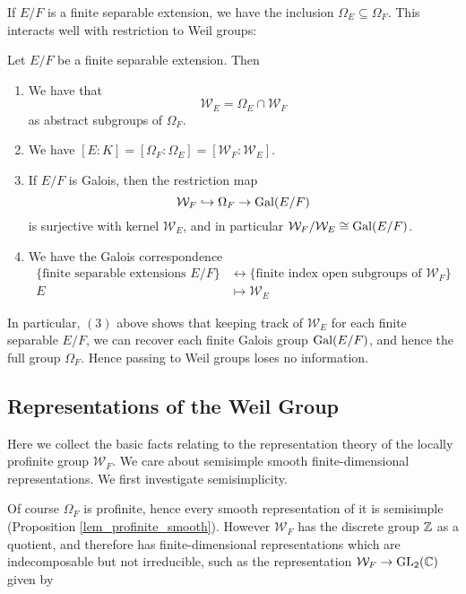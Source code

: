 If $E/F$ is a finite separable extension, we have the inclusion $\Omega_E\subseteq \Omega_F$. This interacts well with restriction to Weil groups:
\begin{prop}
	Let $E/F$ be a finite separable extension. Then
	\begin{enumerate}
		\item We have that
		\[\mathcal{W}_E = \Omega_E\cap \mathcal{W}_F\]
		as abstract subgroups of $\Omega_F$.
		\item We have $[E:K] = [\Omega_F:\Omega_E] = [\mathcal{W}_F:\mathcal{W}_E]$.
		\item If $E/F$ is Galois, then the restriction map
		\[\mathcal{W}_F \hookrightarrow \Omega_F \to \mathrm{Gal}(E/F)\]
		is surjective with kernel $\mathcal{W}_E$, and in particular $\mathcal{W}_F/\mathcal{W}_E\cong \mathrm{Gal}(E/F)$.
		\item We have the Galois correspondence
		\begin{align*}
			\{\text{finite separable extensions }E/F\} &\leftrightarrow \{\text{finite index open subgroups of }\mathcal{W}_F\}\\
			 E &\mapsto \mathcal{W}_E
		\end{align*}
	\end{enumerate}
\end{prop}
In particular, $(3)$ above shows that keeping track of $\mathcal{W}_E$ for each finite separable $E/F$, we can recover each finite Galois group $\mathrm{Gal}(E/F)$, and hence the full group $\Omega_F$. Hence passing to Weil groups loses no information.

\subsection{Representations of the Weil Group}
Here we collect the basic facts relating to the representation theory of the locally profinite group $\mathcal{W}_F$. We care about semisimple smooth finite-dimensional representations. We first investigate semisimplicity.

Of course $\Omega_F$ is profinite, hence every smooth representation of it is semisimple (Proposition \ref{lem_profinite_smooth}). However $\mathcal{W}_F$ has the discrete group $\mathbb{Z}$ as a quotient, and therefore has finite-dimensional representations which are indecomposable but not irreducible, such as the representation $\mathcal{W}_F\to \mathrm{GL}_2(\mathbb{C})$ given by

